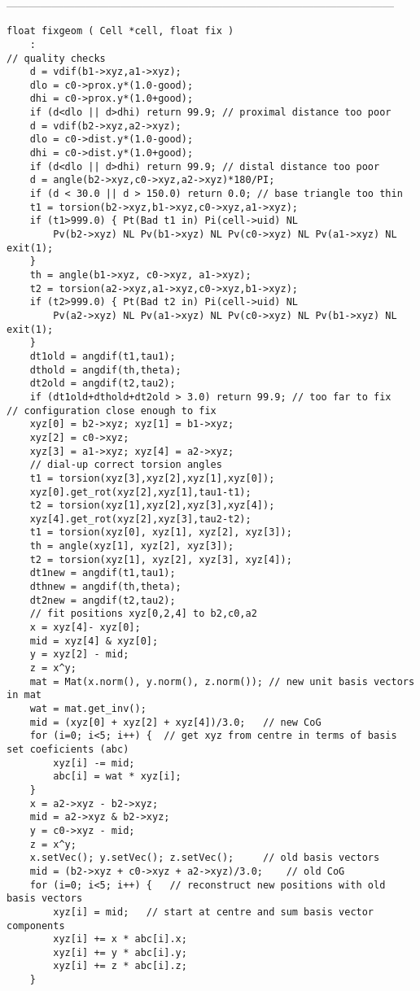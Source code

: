 \begin{singlespace}
\ \\
------------------------------------------------------------------------------------------------------
\begin{tiny}
\begin{verbatim}
float fixgeom ( Cell *cell, float fix )
	:
// quality checks
	d = vdif(b1->xyz,a1->xyz);
	dlo = c0->prox.y*(1.0-good);
	dhi = c0->prox.y*(1.0+good);
	if (d<dlo || d>dhi) return 99.9; // proximal distance too poor
	d = vdif(b2->xyz,a2->xyz);
	dlo = c0->dist.y*(1.0-good);
	dhi = c0->dist.y*(1.0+good);
	if (d<dlo || d>dhi) return 99.9; // distal distance too poor
	d = angle(b2->xyz,c0->xyz,a2->xyz)*180/PI;
	if (d < 30.0 || d > 150.0) return 0.0; // base triangle too thin
	t1 = torsion(b2->xyz,b1->xyz,c0->xyz,a1->xyz);
	if (t1>999.0) { Pt(Bad t1 in) Pi(cell->uid) NL
		Pv(b2->xyz) NL Pv(b1->xyz) NL Pv(c0->xyz) NL Pv(a1->xyz) NL exit(1);
	}
	th = angle(b1->xyz, c0->xyz, a1->xyz);
	t2 = torsion(a2->xyz,a1->xyz,c0->xyz,b1->xyz);
	if (t2>999.0) { Pt(Bad t2 in) Pi(cell->uid) NL
		Pv(a2->xyz) NL Pv(a1->xyz) NL Pv(c0->xyz) NL Pv(b1->xyz) NL exit(1);
	}
	dt1old = angdif(t1,tau1);
	dthold = angdif(th,theta);
	dt2old = angdif(t2,tau2);
	if (dt1old+dthold+dt2old > 3.0) return 99.9; // too far to fix
// configuration close enough to fix
	xyz[0] = b2->xyz; xyz[1] = b1->xyz;
	xyz[2] = c0->xyz;
	xyz[3] = a1->xyz; xyz[4] = a2->xyz;
	// dial-up correct torsion angles
	t1 = torsion(xyz[3],xyz[2],xyz[1],xyz[0]);
	xyz[0].get_rot(xyz[2],xyz[1],tau1-t1);
	t2 = torsion(xyz[1],xyz[2],xyz[3],xyz[4]);
	xyz[4].get_rot(xyz[2],xyz[3],tau2-t2);
	t1 = torsion(xyz[0], xyz[1], xyz[2], xyz[3]);
	th = angle(xyz[1], xyz[2], xyz[3]);
	t2 = torsion(xyz[1], xyz[2], xyz[3], xyz[4]);
	dt1new = angdif(t1,tau1);
	dthnew = angdif(th,theta);
	dt2new = angdif(t2,tau2);
	// fit positions xyz[0,2,4] to b2,c0,a2
	x = xyz[4]- xyz[0];
	mid = xyz[4] & xyz[0];
	y = xyz[2] - mid;
	z = x^y;
	mat = Mat(x.norm(), y.norm(), z.norm()); // new unit basis vectors in mat
	wat = mat.get_inv();
	mid = (xyz[0] + xyz[2] + xyz[4])/3.0;	// new CoG
	for (i=0; i<5; i++) {  // get xyz from centre in terms of basis set coeficients (abc)
		xyz[i] -= mid;
		abc[i] = wat * xyz[i];
	}
	x = a2->xyz - b2->xyz;
	mid = a2->xyz & b2->xyz;
	y = c0->xyz - mid;
	z = x^y;
	x.setVec(); y.setVec(); z.setVec();		// old basis vectors
	mid = (b2->xyz + c0->xyz + a2->xyz)/3.0;	// old CoG
	for (i=0; i<5; i++) {	// reconstruct new positions with old basis vectors
		xyz[i] = mid;	// start at centre and sum basis vector components
		xyz[i] += x * abc[i].x;
		xyz[i] += y * abc[i].y;
		xyz[i] += z * abc[i].z;
	}


\end{verbatim}
\end{tiny}
\end{singlespace}
